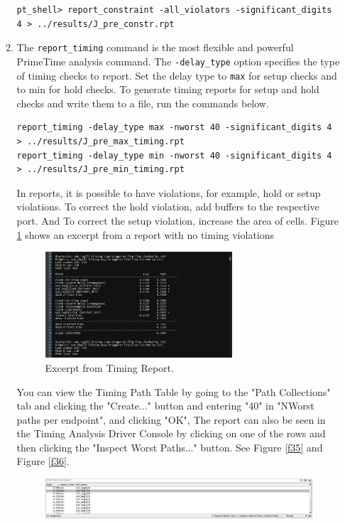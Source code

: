 \documentclass[a4paper,12pt,twoside]{article}
\begin{document}
\begin{enumerate}
\begin{enumerate}
\begin{verbatim}
pt_shell> report_constraint -all_violators -significant_digits 4 > ../results/J_pre_constr.rpt
        \end{verbatim}
        \item The \texttt{report\_timing} command is the most flexible and powerful PrimeTime analysis command. The \texttt{-delay\_type} option specifies the type of timing checks to report. Set the delay type to \texttt{max} for setup checks and to min for hold checks. To generate timing reports for setup and hold checks and write them to a file, run the commands below.
        \begin{verbatim}
report_timing -delay_type max -nworst 40 -significant_digits 4 > ../results/J_pre_max_timing.rpt
report_timing -delay_type min -nworst 40 -significant_digits 4 > ../results/J_pre_min_timing.rpt
        \end{verbatim}
        In reports, it is possible to have violations, for example, hold or setup violations. To correct the hold violation, add buffers to the respective port. And To correct the setup violation, increase the area of cells. Figure \ref{f34} shows an excerpt from a report with no timing violations
        \begin{figure}[H]
            \centering
            \includegraphics[width=0.7\textwidth]{images/34.png}
            \caption{Excerpt from Timing Report.}
            \label{f34}
        \end{figure}
        You can view the Timing Path Table by going to the "Path Collections" tab and clicking the "Create..." button and entering "40" in "NWorst paths per endpoint", and clicking "OK", The report can also be seen in the Timing Analysis Driver Console by clicking on one of the rows and then clicking the "Inspect Worst Paths..." button. See Figure \ref{f35} and Figure \ref{f36}.
        \begin{figure}[H]
            \centering
            \includegraphics[width=\textwidth]{images/35.png}

\end{figure}
\end{enumerate}
\end{enumerate}
\end{document}
